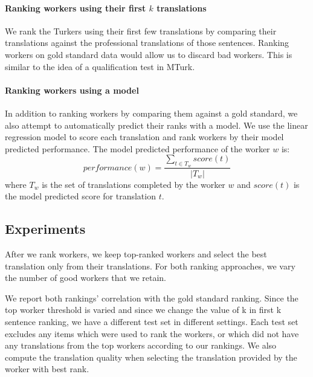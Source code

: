 \documentclass[11pt,letterpaper]{article}
\begin{document}

\paragraph{Ranking workers using their first $k$ translations}
We rank the Turkers using their first few translations by comparing their translations against the professional translations of those sentences. Ranking workers on gold standard data would allow us to discard bad workers. This is similar to the idea of a qualification test in MTurk. 

\paragraph{Ranking workers using a model}
In addition to ranking workers by comparing them against a gold standard, we also attempt to automatically predict their ranks with a model. 
We use the linear regression model to score each translation and rank workers by their model predicted performance.  
 The model predicted performance of the worker $w$ is:
\begin{equation}
performance(w) = \frac{\sum_{t \in T_{w}} score (t)}{|T_{w}|}
\end{equation}
where $T_{w} $ is the set of translations completed by the worker $w$ and  $score(t)$ is the model predicted score for translation $t$. 
 

\subsection{Experiments}

After we rank workers, we keep top-ranked workers and select the best translation only from their translations. For both ranking approaches, we vary the number of good workers that we retain. 

We report both rankings' correlation with the gold standard ranking. Since the top worker threshold is varied and since we change the value of k in first k sentence ranking, we have a different test set in different settings. Each test set excludes any items which were used to rank the workers, or which did not have any translations from the top workers according to our rankings. 
We also compute the translation quality when selecting the translation provided by the worker with best rank.
\end{document}

